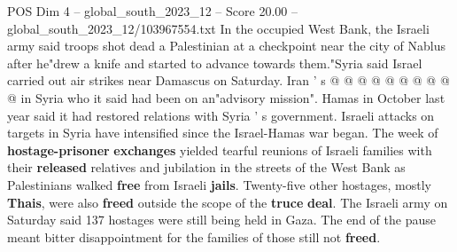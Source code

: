 \begin{textsample}{POS Dim 4 – global\_south\_2023\_12 – Score 20.00 – global\_south\_2023\_12/103967554.txt}
In the occupied West Bank, the Israeli army said troops shot dead a Palestinian at a checkpoint near the city of Nablus after he"drew a knife and started to advance towards them."Syria said Israel carried out air strikes near Damascus on Saturday.
Iran ' s @ @ @ @ @ @ @ @ @ @ in Syria who it said had been on an"advisory mission".
Hamas in October last year said it had restored relations with Syria ' s government.
Israeli attacks on targets in Syria have intensified since the Israel-Hamas war began.
The week of \textbf{hostage-prisoner} \textbf{exchanges} yielded tearful reunions of Israeli families with their \textbf{released} relatives and jubilation in the streets of the West Bank as Palestinians walked \textbf{free} from Israeli \textbf{jails}.
Twenty-five other hostages, mostly \textbf{Thais}, were also \textbf{freed} outside the scope of the \textbf{truce} \textbf{deal}.
The Israeli army on Saturday said 137 hostages were still being held in Gaza.
The end of the pause meant bitter disappointment for the families of those still not \textbf{freed}.

\end{textsample}
